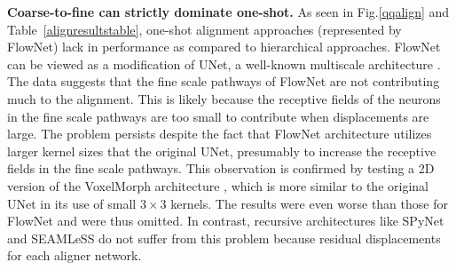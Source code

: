 \documentclass{article}
\begin{document}

\textbf {Coarse-to-fine can strictly dominate one-shot. } As seen in Fig.\ref{qqalign} and Table~\ref{alignresultstable}, one-shot alignment approaches (represented by FlowNet) lack in performance as compared to hierarchical approaches. FlowNet can be viewed as a modification of UNet, a well-known multiscale architecture \citep{UNet}. The data suggests that the fine scale pathways of FlowNet are not contributing much to the alignment. This is likely because the receptive fields of the neurons in the fine scale pathways are too small to contribute when displacements are large. The problem persists despite the fact that FlowNet architecture utilizes larger kernel sizes that the original UNet, presumably to increase the receptive fields in the fine scale pathways. This observation is confirmed by testing a 2D version of the VoxelMorph architecture \citep{balakrishnan2018unsupervised}, which is more similar to the original UNet in its use of small $3\times 3$ kernels. The results were even worse than those for FlowNet and were thus omitted. In contrast, recursive architectures like SPyNet and SEAMLeSS do not suffer from this problem because residual displacements for each aligner network.
\end{document}
